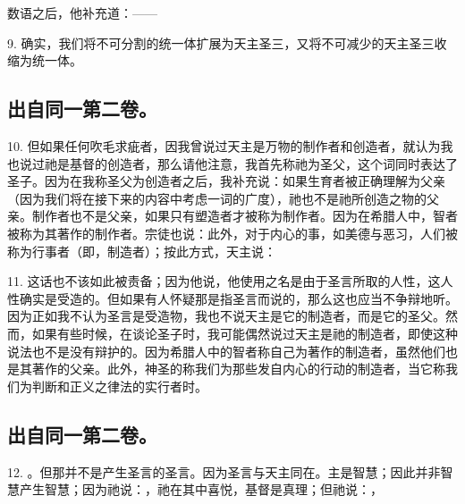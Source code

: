 数语之后，他补充道：——\par

9. 确实，我们将不可分割的统一体扩展为天主圣三，又将不可减少的天主圣三收缩为统一体。\par


\subsection{出自同一第二卷。}

10. 但如果任何吹毛求疵者，因我曾说过天主是万物的制作者和创造者，就认为我也说过祂是基督的创造者，那么请他注意，我首先称祂为圣父，这个词同时表达了圣子。因为在我称圣父为创造者之后，我补充说：如果生育者被正确理解为父亲（因为我们将在接下来的内容中考虑一词的广度），祂也不是祂所创造之物的父亲。制作者也不是父亲，如果只有塑造者才被称为制作者。因为在希腊人中，智者被称为其著作的制作者。宗徒也说：此外，对于内心的事，如美德与恶习，人们被称为行事者（即，制造者）；按此方式，天主说：\par

11. 这话也不该如此被责备；因为他说，他使用之名是由于圣言所取的人性，这人性确实是受造的。但如果有人怀疑那是指圣言而说的，那么这也应当不争辩地听。因为正如我不认为圣言是受造物，我也不说天主是它的制造者，而是它的圣父。然而，如果有些时候，在谈论圣子时，我可能偶然说过天主是祂的制造者，即使这种说法也不是没有辩护的。因为希腊人中的智者称自己为著作的制造者，虽然他们也是其著作的父亲。此外，神圣的称我们为那些发自内心的行动的制造者，当它称我们为判断和正义之律法的实行者时。\par


\subsection{出自同一第二卷。}

12. 。但那并不是产生圣言的圣言。因为圣言与天主同在。主是智慧；因此并非智慧产生智慧；因为祂说：，祂在其中喜悦，基督是真理；但祂说：，\par


